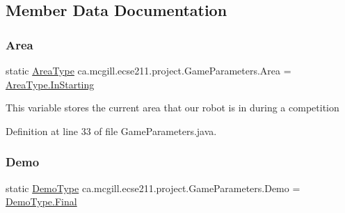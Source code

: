 \subsection{Member Data Documentation}
\mbox{\label{enumca_1_1mcgill_1_1ecse211_1_1project_1_1_game_parameters_a32080f9c0e2e23c0feefc272620a07ad}} 
\subsubsection{\texorpdfstring{Area}{Area}}
{\footnotesize\ttfamily  static  \hyperlink{enumca_1_1mcgill_1_1ecse211_1_1project_1_1_game_parameters_1_1_area_type}{Area\+Type} ca.\+mcgill.\+ecse211.\+project.\+Game\+Parameters.\+Area = \hyperlink{enumca_1_1mcgill_1_1ecse211_1_1project_1_1_game_parameters_1_1_area_type_a90e9cb33114c7af62aa86684942265e5}{Area\+Type.\+In\+Starting}\hspace{0.3cm}{\ttfamily [static]}}

This variable stores the current area that our robot is in during a competition 

Definition at line 33 of file Game\+Parameters.\+java.

\mbox{\label{enumca_1_1mcgill_1_1ecse211_1_1project_1_1_game_parameters_a36e932159f5f7e0f5e2e78f00d6f7e93}} 
\subsubsection{\texorpdfstring{Demo}{Demo}}
{\footnotesize\ttfamily  static  \hyperlink{enumca_1_1mcgill_1_1ecse211_1_1project_1_1_game_parameters_1_1_demo_type}{Demo\+Type} ca.\+mcgill.\+ecse211.\+project.\+Game\+Parameters.\+Demo = \hyperlink{enumca_1_1mcgill_1_1ecse211_1_1project_1_1_game_parameters_1_1_demo_type_a1ba3e060bfd5f76af77b713321abc7f6}{Demo\+Type.\+Final}\hspace{0.3cm}{\ttfamily [static]}}

